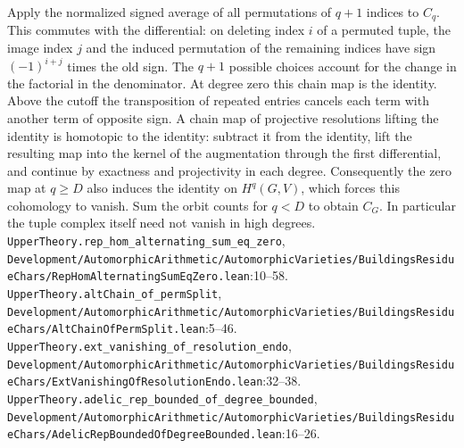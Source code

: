 Apply the normalized signed average of all permutations of $q+1$ indices to $C_q$. This commutes with the differential: on deleting index $i$ of a permuted tuple, the image index $j$ and the induced permutation of the remaining indices have sign $(-1)^{i+j}$ times the old sign. The $q+1$ possible choices account for the change in the factorial in the denominator. At degree zero this chain map is the identity. Above the cutoff the transposition of repeated entries cancels each term with another term of opposite sign. A chain map of projective resolutions lifting the identity is homotopic to the identity: subtract it from the identity, lift the resulting map into the kernel of the augmentation through the first differential, and continue by exactness and projectivity in each degree. Consequently the zero map at $q\ge D$ also induces the identity on $H^q(G,V)$, which forces this cohomology to vanish. Sum the orbit counts for $q<D$ to obtain $C_G$. In particular the tuple complex itself need not vanish in high degrees.
{\footnotesize\nolinkurl{UpperTheory.rep_hom_alternating_sum_eq_zero}, \nolinkurl{Development/AutomorphicArithmetic/AutomorphicVarieties/BuildingsResidueChars/RepHomAlternatingSumEqZero.lean}\allowbreak:10--58.} {\footnotesize\nolinkurl{UpperTheory.altChain_of_permSplit}, \nolinkurl{Development/AutomorphicArithmetic/AutomorphicVarieties/BuildingsResidueChars/AltChainOfPermSplit.lean}\allowbreak:5--46.} {\footnotesize\nolinkurl{UpperTheory.ext_vanishing_of_resolution_endo}, \nolinkurl{Development/AutomorphicArithmetic/AutomorphicVarieties/BuildingsResidueChars/ExtVanishingOfResolutionEndo.lean}\allowbreak:32--38.} {\footnotesize\nolinkurl{UpperTheory.adelic_rep_bounded_of_degree_bounded}, \nolinkurl{Development/AutomorphicArithmetic/AutomorphicVarieties/BuildingsResidueChars/AdelicRepBoundedOfDegreeBounded.lean}\allowbreak:16--26.}

